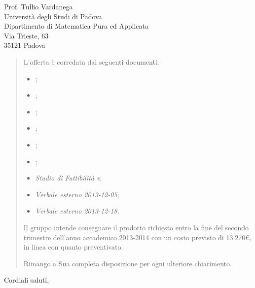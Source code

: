 \documentclass{letter}
\begin{document}
\begin{letter}{
	Prof. Tullio Vardanega \\
	Università degli Studi di Padova \\
	Dipartimento di Matematica Pura ed Applicata \\
	Via Trieste, 63 \\
	35121 Padova
}
\begin{quotation}
	L'offerta è corredata dai seguenti documenti:

	\begin{itemize}

		\item \AnalisiDeiRequisiti{};
		\item \Glossario{};
		\item \NormeDiProgetto{};
		\item \PianoDiProgetto{};
		\item \PianoDiQualifica{};
		\item \SpecificaTecnica{};
		\item \emph{Studio di Fattibilità v\VersioneSF{}};
		\item \emph{Verbale esterno 2013-12-05};
		\item \emph{Verbale esterno 2013-12-18}.

	\end{itemize}

	Il gruppo \GroupName{} intende consegnare il prodotto richiesto entro la fine del secondo trimestre dell'anno accademico 2013-2014 con un costo previsto di 13.270\euro, in linea con quanto preventivato.

	Rimango a Sua completa disposizione per ogni ulteriore chiarimento.

\end{quotation}

\closing{Cordiali saluti,}


\end{letter}
\end{document}
